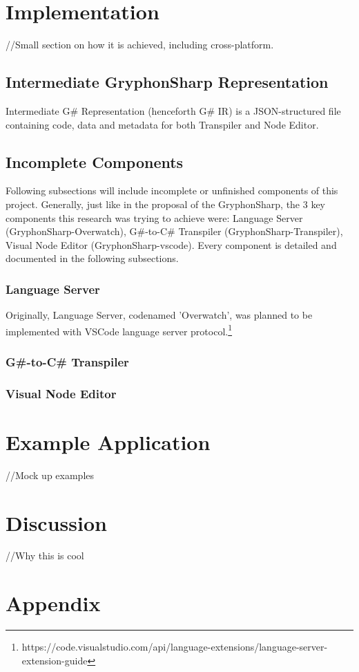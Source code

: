 \documentclass{article}
\begin{document}
\section{Implementation}
//Small section on how it is achieved, including cross-platform.
\subsection{Intermediate GryphonSharp Representation}
Intermediate G\# Representation (henceforth G\# IR) is a JSON-structured file containing code, data and metadata for both Transpiler and Node Editor.
\subsection{Incomplete Components}
Following subsections will include incomplete or unfinished components of this project. Generally, just like in the proposal of the GryphonSharp, the 3 key components this research was trying to achieve were: Language Server (GryphonSharp-Overwatch), G\#-to-C\# Transpiler (GryphonSharp-Transpiler), Visual Node Editor (GryphonSharp-vscode). Every component is detailed and documented in the following subsections.

\subsubsection{Language Server}
Originally, Language Server, codenamed 'Overwatch', was planned to be implemented with VSCode language server protocol.\footnote{https://code.visualstudio.com/api/language-extensions/language-server-extension-guide}
\subsubsection{G\#-to-C\# Transpiler}
\subsubsection{Visual Node Editor}





\section{Example Application}
//Mock up examples






\section{Discussion}
//Why this is cool






\section{Appendix}


\pagebreak


\end{document}
